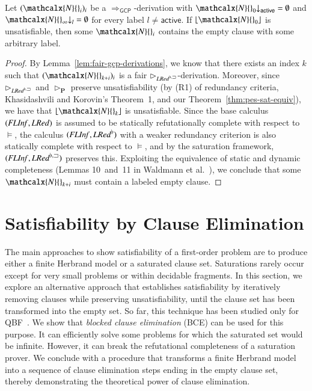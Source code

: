 \begin{rep}
\begin{theorem}
\label{thm:gcp-complete}
Let $(\mathcalx{N}{}_i)_i$ be a $\Longrightarrow_\mathsf{GCP}$-derivation
with
$\mathcalx{N}{}_0{\downarrow}_\mathsf{active} = \emptyset$
and
$\mathcalx{N}{}_\infty{\downarrow}_l = \emptyset$ for every label
$l \not= \ensuremath{\mathsf{active}}$.
If $\lfloor \mathcalx{N}{}_0\rfloor$ is unsatisfiable,
then
some $\mathcalx{N}{}_i$
contains the empty clause with some arbitrary label.
\end{theorem}

\begin{proof}
By Lemma~\ref{lem:fair-gcp-derivations},
we know that there exists an index $k$ such that
$(\mathcalx{N}{}_{k+i})_i$ is a fair $\rhd_{\mathit{LRed}^{\flat,\sqsupset}}$-derivation.
Moreover, since
$\rhd_{\mathit{LRed}^{\flat,\sqsupset}}$ and
$\rhd_\mathbf{P}$ preserve unsatisfiability
(by (R1) of redundancy criteria, Khasidashvili and Korovin's Theorem~1, and our
Theorem~\ref{thm:pes-sat-equiv}), we have that
$\lfloor \mathcalx{N}{}_k\rfloor$ is unsatisfiable.
Since the base calculus $(\mathit{FLInf},\allowbreak\mathit{LRed})$ is assumed to be statically
refutationally complete with respect to $\models$, the calculus
$(\mathit{FLInf},\allowbreak\mathit{LRed}^{\flat})$ with a weaker redundancy criterion is also
statically complete with respect to $\models$, and by the saturation framework,
$(\mathit{FLInf},\allowbreak\mathit{LRed}^{\flat,\sqsupset})$ preserves this. Exploiting the equivalence of
static and dynamic completeness (Lemmas 10~and~11
in Waldmann et al.~\cite{waldmann-et-al-202x-article}), we conclude that some $\mathcalx{N}{}_{k+i}$ must
contain a labeled empty clause.
\end{proof}
\end{rep}

\section{Satisfiability by Clause Elimination}
\label{sec:satfol:satisfiability-by-clause-elimination}

The main approaches to show satisfiability of a first-order problem are to
produce either a finite Herbrand model or a saturated clause set. Saturations
rarely occur except for very small problems or within decidable fragments. In
this section, we explore an alternative approach that establishes satisfiability
by iteratively removing clauses while preserving
unsatisfiability,
until the clause set has been transformed into the empty set. So
far, this technique has been studied only for QBF~\cite{hsb-14-QRAT}. We show that
\emph{blocked clause elimination} (BCE)
can be used for this purpose. It can efficiently solve some problems for which
the saturated set would be infinite. However, it can break the refutational
completeness of a saturation prover. We conclude with a procedure that
transforms a finite Herbrand model into a sequence of clause elimination steps
ending in the empty clause set, thereby demonstrating the theoretical power of
clause elimination.

